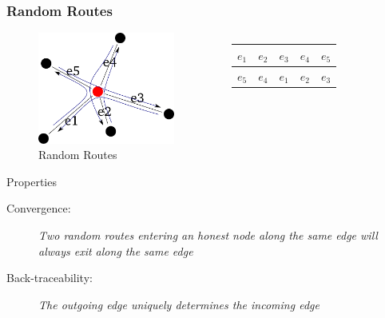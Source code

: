 \documentclass{beamer}
\begin{document}
\begin{frame}

  \frametitle{Random Routes}

  \begin{figure}
    \begin{columns}
      \begin{column}{4.5cm}
	\includegraphics[width=4.5cm]{./pictures/random_route} 
      \end{column}
      \begin{column}{3cm}
	\begin{center}
	  \begin{tabular}{|c|c|c|c|c|}
	    \hline
	    $e_1$ & $e_2$ & $e_3$ & $e_4$ & $e_5$ \\
	    \hline
	    $e_5$ & $e_4$ & $e_1$ & $e_2$ & $e_3$ \\
	    \hline
	  \end{tabular}
	\end{center}
      \end{column}
    \end{columns}

    \caption{Random Routes}
  \end{figure}

  \begin{block}{Properties}
    \begin{description}
      \item[Convergence:] {\small \emph{Two random routes entering an honest node along the same edge will always exit along the same edge}}
      \item[Back-traceability:] {\small \emph{The outgoing edge uniquely determines the incoming edge}}
    \end{description}
  \end{block}

\end{frame}

\end{document}
